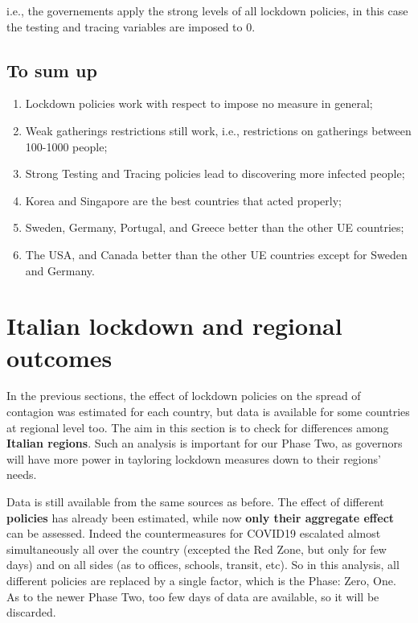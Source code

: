 \documentclass[
  6pt,
]{article}
\begin{document}
i.e., the governements apply the strong levels of all lockdown policies,
in this case the testing and tracing variables are imposed to \(0\).

\hypertarget{to-sum-up}{%
\subsection{To sum up}\label{to-sum-up}}

\begin{enumerate}
\def\labelenumi{\arabic{enumi}.}
\item
  Lockdown policies work with respect to impose no measure in general;
\item
  Weak gatherings restrictions still work, i.e., restrictions on
  gatherings between 100-1000 people;
\item
  Strong Testing and Tracing policies lead to discovering more infected
  people;
\item
  Korea and Singapore are the best countries that acted properly;
\item
  Sweden, Germany, Portugal, and Greece better than the other UE
  countries;
\item
  The USA, and Canada better than the other UE countries except for
  Sweden and Germany.
\end{enumerate}

\hypertarget{italian-lockdown-and-regional-outcomes}{%
\section{Italian lockdown and regional
outcomes}\label{italian-lockdown-and-regional-outcomes}}

In the previous sections, the effect of lockdown policies on the spread
of contagion was estimated for each country, but data is available for
some countries at regional level too. The aim in this section is to
check for differences among \textbf{Italian regions}. Such an analysis
is important for our Phase Two, as governors will have more power in
tayloring lockdown measures down to their regions' needs.

Data is still available from the same sources as before. The effect of
different \textbf{policies} has already been estimated, while now
\textbf{only their aggregate effect} can be assessed. Indeed the
countermeasures for COVID19 escalated almost simultaneously all over the
country (excepted the Red Zone, but only for few days) and on all sides
(as to offices, schools, transit, etc). So in this analysis, all
different policies are replaced by a single factor, which is the Phase:
Zero, One. As to the newer Phase Two, too few days of data are
available, so it will be discarded.
\end{document}
